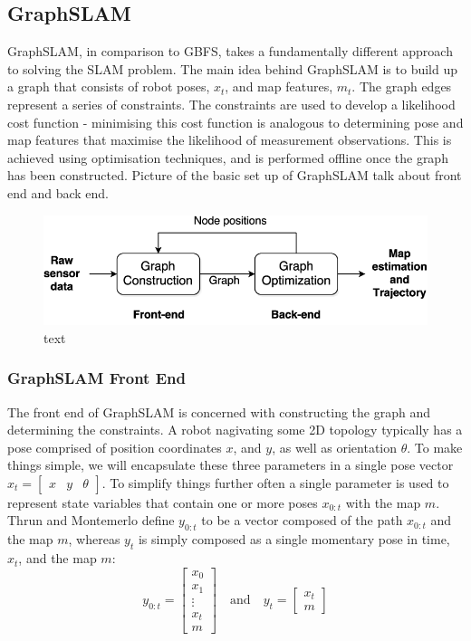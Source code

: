 \documentclass[a4paper]{article}
\begin{document}
\subsection{GraphSLAM}
GraphSLAM, in comparison to GBFS, takes a fundamentally different approach to solving the SLAM problem. The main idea behind GraphSLAM is to build up a graph that consists of robot poses, $x_t$, and map features, $m_t$. The graph edges represent a series of constraints. The constraints are used to develop a likelihood cost function - minimising this cost function is analogous to determining pose and map features that maximise the likelihood of measurement observations. This is achieved using optimisation techniques, and is performed offline once the graph has been constructed. Picture of the basic set up of GraphSLAM talk about front end and back end.
\begin{figure}[h]
\centering
\includegraphics[scale=0.35]{Graph-SLAM-system}
\caption{text}
\end{figure}


\subsubsection{GraphSLAM Front End}
The front end of GraphSLAM is concerned with constructing the graph and determining the constraints. A robot nagivating some 2D topology typically has a pose comprised of position coordinates $x$, and $y$, as well as orientation $\theta$. To make things simple, we will encapsulate these three parameters in a single pose vector $x_t = \begin{bmatrix} x & y & \theta \end{bmatrix}$. To simplify things further often a single parameter is used to represent state variables that contain one or more poses $x_{0:t}$ with the map $m$. Thrun and Montemerlo define $y_{0:t}$ to be a vector composed of the path $x_{0:t}$ and the map $m$, whereas $y_t$ is simply composed as a single momentary pose in time, $x_t$, and the map $m$:
\begin{equation}
y_{0:t} =
\begin{bmatrix}
x_0 \\ x_1 \\ \vdots \\ x_t \\ m
\end{bmatrix}
\quad\mathrm{and}\quad 
y_t =
\begin{bmatrix}
x_t \\ m
\end{bmatrix}
\end{equation}
\end{document}
